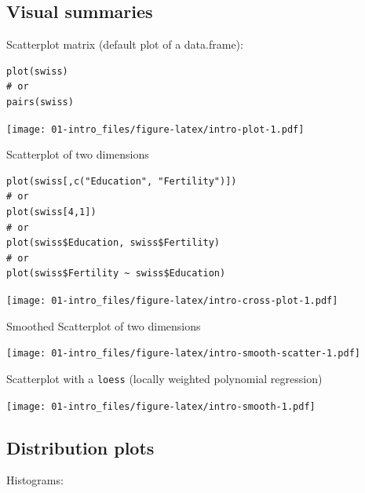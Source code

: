 \documentclass[]{book}
\newenvironment{Shaded}{\begin{snugshade}}{\end{snugshade}}
\newcommand{\KeywordTok}[1]{\textcolor[rgb]{0.13,0.29,0.53}{\textbf{{#1}}}}
\newcommand{\StringTok}[1]{\textcolor[rgb]{0.31,0.60,0.02}{{#1}}}
\newcommand{\NormalTok}[1]{{#1}}
\theoremstyle{definition}
\theoremstyle{definition}
\theoremstyle{remark}
\begin{document}
\subsection{Visual summaries}\label{visual-summaries}

Scatterplot matrix (default plot of a data.frame):

\begin{verbatim}
plot(swiss)
# or
pairs(swiss)
\end{verbatim}

\texttt{[image: 01-intro\_files/figure-latex/intro-plot-1.pdf]}

Scatterplot of two dimensions

\begin{verbatim}
plot(swiss[,c("Education", "Fertility")])
# or
plot(swiss[4,1])
# or
plot(swiss$Education, swiss$Fertility)
# or
plot(swiss$Fertility ~ swiss$Education)
\end{verbatim}

\texttt{[image: 01-intro\_files/figure-latex/intro-cross-plot-1.pdf]}

Smoothed Scatterplot of two dimensions

\begin{Shaded}
\end{Shaded}

\texttt{[image: 01-intro\_files/figure-latex/intro-smooth-scatter-1.pdf]}

Scatterplot with a \texttt{loess} (locally weighted polynomial
regression)

\begin{Shaded}
\end{Shaded}

\texttt{[image: 01-intro\_files/figure-latex/intro-smooth-1.pdf]}

\subsection{Distribution plots}\label{distribution-plots}

Histograms:

\begin{Shaded}
\end{Shaded}
\end{document}
